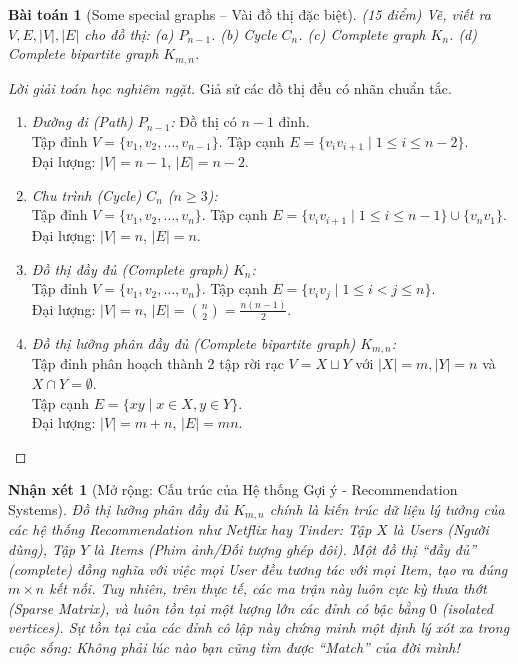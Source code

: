 \documentclass{article}
\newtheorem{baitoan}{Bài toán}
\newtheorem{nhanxet}{Nhận xét}
\begin{document}
\begin{baitoan}[Some special graphs -- Vài đồ thị đặc biệt]
	\emph{(15 điểm)} Vẽ, viết ra $V,E,|V|,|E|$ cho đồ thị: (a) $P_{n-1}$. (b) Cycle $C_n$. (c) Complete graph $K_n$. (d) Complete bipartite graph $K_{m,n}$.
\end{baitoan}

\begin{proof}[Lời giải toán học nghiêm ngặt]
	Giả sử các đồ thị đều có nhãn chuẩn tắc.
	\begin{enumerate}[label=(\alph*)]
		\item \emph{Đường đi (Path) $P_{n-1}$:} Đồ thị có $n-1$ đỉnh.\\
		Tập đỉnh $V = \{v_1, v_2, \ldots, v_{n-1}\}$. Tập cạnh $E = \{v_i v_{i+1} \mid 1 \le i \le n-2\}$.\\
		Đại lượng: $|V| = n-1$, $|E| = n-2$.
		\item \emph{Chu trình (Cycle) $C_n$ ($n \ge 3$):}\\
		Tập đỉnh $V = \{v_1, v_2, \ldots, v_n\}$. Tập cạnh $E = \{v_i v_{i+1} \mid 1 \le i \le n-1\} \cup \{v_n v_1\}$.\\
		Đại lượng: $|V| = n$, $|E| = n$.
		\item \emph{Đồ thị đầy đủ (Complete graph) $K_n$:}\\
		Tập đỉnh $V = \{v_1, v_2, \ldots, v_n\}$. Tập cạnh $E = \{v_i v_j \mid 1 \le i < j \le n\}$.\\
		Đại lượng: $|V| = n$, $|E| = \binom{n}{2} = \frac{n(n-1)}{2}$.
		\item \emph{Đồ thị lưỡng phân đầy đủ (Complete bipartite graph) $K_{m,n}$:}\\
		Tập đỉnh phân hoạch thành 2 tập rời rạc $V = X \sqcup Y$ với $|X|=m, |Y|=n$ và $X \cap Y = \emptyset$.\\
		Tập cạnh $E = \{xy \mid x \in X, y \in Y\}$.\\
		Đại lượng: $|V| = m+n$, $|E| = mn$.
	\end{enumerate}
\end{proof}

\begin{nhanxet}[Mở rộng: Cấu trúc của Hệ thống Gợi ý - Recommendation Systems]
	Đồ thị lưỡng phân đầy đủ $K_{m,n}$ chính là kiến trúc dữ liệu lý tưởng của các hệ thống Recommendation như \textsf{Netflix} hay \textsf{Tinder}: Tập $X$ là \textit{Users} (Người dùng), Tập $Y$ là \textit{Items} (Phim ảnh/Đối tượng ghép đôi). Một đồ thị ``đầy đủ'' (\textit{complete}) đồng nghĩa với việc \emph{mọi} User đều tương tác với \emph{mọi} Item, tạo ra đúng $m \times n$ kết nối. Tuy nhiên, trên thực tế, các ma trận này luôn cực kỳ thưa thớt (\textit{Sparse Matrix}), và luôn tồn tại một lượng lớn các đỉnh có bậc bằng $0$ (\textit{isolated vertices}). Sự tồn tại của các đỉnh cô lập này chứng minh một định lý xót xa trong cuộc sống: Không phải lúc nào bạn cũng tìm được ``Match'' của đời mình!
\end{nhanxet}
\end{document}
